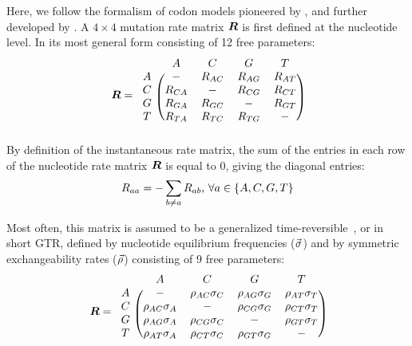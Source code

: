 Here, we follow the formalism of \gls{codon} models pioneered by \citet{Muse1994}, and further developed by \citet{Nielsen1998}.
A $4 \times 4$ mutation rate matrix $\bm{R}$ is first defined at the nucleotide level.
In its most general form consisting of 12 free parameters:
\begin{equation}
    \label{eq:mutrates}
    \Mutmatrix =
    \begin{blockarray}{ccccc}
        & A & C & G & T \\
        \begin{block}{c(cccc)}
            A & - & {\mutmatrix_{AC}} & {\mutmatrix_{AG}} & {\mutmatrix_{AT}} \\
            C & {\mutmatrix_{CA}} &                 - & {\mutmatrix_{CG}} & {\mutmatrix_{CT}} \\
            G & {\mutmatrix_{GA}} & {\mutmatrix_{GC}} &                 - & {\mutmatrix_{GT}} \\
            T & {\mutmatrix_{TA}} & {\mutmatrix_{TC}} & {\mutmatrix_{TG}} & - \\
        \end{block}
    \end{blockarray}
\end{equation}
By definition of the instantaneous rate matrix, the sum of the entries in each row of the nucleotide rate matrix $\bm{R}$ is equal to $0$, giving the diagonal entries:
\begin{equation}
    R_{aa} = - \sum\limits_{ b \neq a} R_{ab}\text{, } \forall a \in \{A,C,G,T\}
\end{equation}

Most often, this matrix is assumed to be a generalized time-reversible~\citep{Tavare1986}, or in short \acrshort{GTR}, defined by nucleotide equilibrium frequencies ($\vec{\sigma}$) and by symmetric exchangeability rates ($\vec{\rho}$) consisting of 9 free parameters:
\begin{equation}
    \label{eq:mutrates-GTR}
    \Mutmatrix =
    \begin{blockarray}{ccccc}
        & A & C & G & T \\
        \begin{block}{c(cccc)}
            A & - & {\exchan_{AC}\mutequi_C} & {\exchan_{AG}\mutequi_G} & {\exchan_{AT}\mutequi_T} \\
            C & {\exchan_{AC}\mutequi_A} &                        - & {\exchan_{CG}\mutequi_G} & {\exchan_{CT}\mutequi_T} \\
            G & {\exchan_{AG}\mutequi_A} & {\exchan_{CG}\mutequi_C} &                        - & {\exchan_{GT}\mutequi_T} \\
            T & {\exchan_{AT}\mutequi_A} & {\exchan_{CT}\mutequi_C} & {\exchan_{GT}\mutequi_G} & - \\
        \end{block}
    \end{blockarray}
\end{equation}

